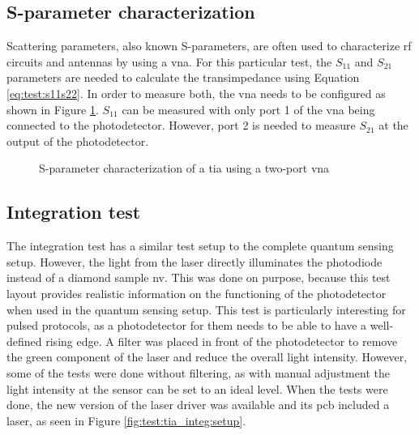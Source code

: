 \subsection{S-parameter characterization}
Scattering parameters, also known S-parameters, are often used to characterize \gls{rf} circuits and antennas by using a \gls{vna}. For this particular test, the $S_{11}$ and $S_{21}$ parameters are needed to calculate the transimpedance using Equation \eqref{eq:test:s11s22}. In order to measure both, the \gls{vna} needs to be configured as shown in Figure \ref{fig:test:s_params:setup}. $S_{11}$ can be measured with only port 1 of the \gls{vna} being connected to the photodetector. However, port 2 is needed to measure $S_21$ at the output of the photodetector.

\begin{figure}[ht]
	\centering
	\caption{S-parameter characterization of a \gls{tia} using a two-port \gls{vna}}
	\label{fig:test:s_params:setup}
\end{figure}

\subsection{Integration test}
The integration test has a similar test setup to the complete quantum sensing setup. However, the light from the laser directly illuminates the photodiode instead of a diamond sample \gls{nv}. This was done on purpose, because this test layout provides realistic information on the functioning of the photodetector when used in the quantum sensing setup. This test is particularly interesting for pulsed protocols, as a photodetector for them needs to be able to have a well-defined rising edge. A filter was placed in front of the photodetector to remove the green component of the laser and reduce the overall light intensity. However, some of the tests were done without filtering, as with manual adjustment the light intensity at the sensor can be set to an ideal level. When the tests were done, the new version of the laser driver was available and its \gls{pcb} included a laser, as seen in Figure \ref{fig:test:tia_integ:setup}. 

